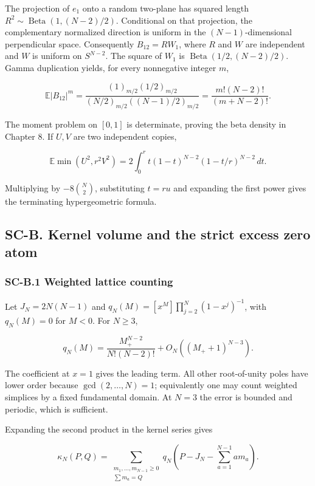 \documentclass[a4paper,11pt]{article}
\numberwithin{equation}{section}
\begin{document}
The projection of \(e_1\) onto a random two-plane has squared length \(R^2\sim\operatorname{Beta}(1,(N-2)/2)\). Conditional on that projection, the complementary normalized direction is uniform in the \((N-1)\)-dimensional perpendicular space. Consequently \(B_{12}=RW_1\), where \(R\) and \(W\) are independent and \(W\) is uniform on \(S^{N-2}\). The square of \(W_1\) is \(\operatorname{Beta}(1/2,(N-2)/2)\). Gamma duplication yields, for every nonnegative integer \(m\),

\[
\mathbb E|B_{12}|^m
=\frac{(1)_{m/2}(1/2)_{m/2}}
{(N/2)_{m/2}((N-1)/2)_{m/2}}
=\frac{m!(N-2)!}{(m+N-2)!}.
\]

The moment problem on \([0,1]\) is determinate, proving the beta density in Chapter 8. If \(U,V\) are two independent copies,

\[
\mathbb E\min(U^2,r^2V^2)
=2\int_0^r t(1-t)^{N-2}(1-t/r)^{N-2}\,dt.
\]

Multiplying by \(-8\binom N2\), substituting \(t=ru\) and expanding the first power gives the terminating hypergeometric formula.

\hypertarget{sc-b.-kernel-volume-and-the-strict-excess-zero-atom}{%
\subsection{SC-B. Kernel volume and the strict excess zero atom}\label{sc-b.-kernel-volume-and-the-strict-excess-zero-atom}}

\hypertarget{sc-b.1-weighted-lattice-counting}{%
\subsubsection{SC-B.1 Weighted lattice counting}\label{sc-b.1-weighted-lattice-counting}}

Let \(J_N=2N(N-1)\) and \(q_N(M)=[x^M]\prod_{j=2}^N(1-x^j)^{-1}\), with \(q_N(M)=0\) for \(M<0\). For \(N\geq3\),

\[
q_N(M)=\frac{M_+^{N-2}}{N!(N-2)!}
+O_N((M_++1)^{N-3}).
\]

The coefficient at \(x=1\) gives the leading term. All other root-of-unity poles have lower order because \(\gcd(2,\ldots,N)=1\); equivalently one may count weighted simplices by a fixed fundamental domain. At \(N=3\) the error is bounded and periodic, which is sufficient.

Expanding the second product in the kernel series gives

\[
\kappa_N(P,Q)=
\sum_{\substack{m_1,\ldots,m_{N-1}\geq0\\\sum m_a=Q}}
q_N\left(P-J_N-\sum_{a=1}^{N-1}a m_a\right).
\]
\end{document}
